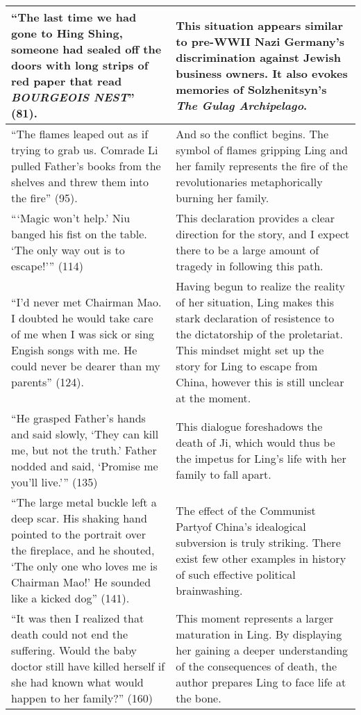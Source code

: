 \documentclass[12pt]{article}
\begin{document}
\begin{longtable}{| p{} | p{} |}
  ``The last time we had gone to Hing Shing, someone had sealed off the doors with long strips of red paper that read \emph{BOURGEOIS NEST}'' (81). & This situation appears similar to pre-WWII Nazi Germany's discrimination against Jewish business owners. It also evokes memories of Solzhenitsyn's \emph{The Gulag Archipelago}. \\
  \hline
  ``The flames leaped out as if trying to grab us. Comrade Li pulled Father's books from the shelves and threw them into the fire'' (95). & And so the conflict begins. The symbol of flames gripping Ling and her family represents the fire of the revolutionaries metaphorically burning her family. \\
  \hline
  ```Magic won't help.' Niu banged his fist on the table. `The only way out is to escape!''' (114) & This declaration provides a clear direction for the story, and I expect there to be a large amount of tragedy in following this path. \\
  \hline
  ``I'd never met Chairman Mao. I doubted he would take care of me when I was sick or sing Engish songs with me. He could never be dearer than my parents'' (124). & Having begun to realize the reality of her situation, Ling makes this stark declaration of resistence to the dictatorship of the proletariat. This mindset might set up the story for Ling to escape from China, however this is still unclear at the moment. \\
  \hline
  ``He grasped Father's hands and said slowly, `They can kill me, but not the truth.' Father nodded and said, `Promise me you'll live.''' (135) & This dialogue foreshadows the death of Ji, which would thus be the impetus for Ling's life with her family to fall apart. \\
  \hline
  ``The large metal buckle left a deep scar. His shaking hand pointed to the portrait over the fireplace, and he shouted, `The only one who loves me is Chairman Mao!' He sounded like a kicked dog'' (141). & The effect of the Communist Partyof China's idealogical subversion is truly striking. There exist few other examples in history of such effective political brainwashing. \\
  \hline
  ``It was then I realized that death could not end the suffering. Would the baby doctor still have killed herself if she had known what would happen to her family?'' (160) & This moment represents a larger maturation in Ling. By displaying her gaining a deeper understanding of the consequences of death, the author prepares Ling to face life at the bone. \\

\end{longtable}
\end{document}
